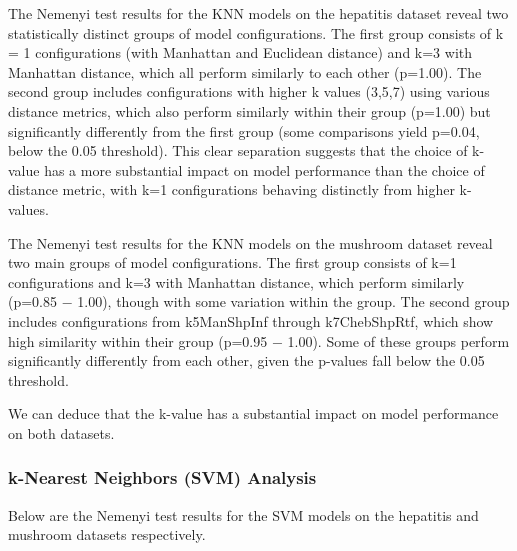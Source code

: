 The Nemenyi test results for the KNN models on the hepatitis dataset reveal two statistically distinct
groups of model configurations. The first group consists of k = 1 configurations
(with Manhattan and Euclidean distance) and k=3 with Manhattan distance, which all perform similarly to each other (p=1.00).
The second group includes configurations with higher k values (3,5,7) using various distance metrics,
which also perform similarly within their group (p=1.00) but significantly differently from the first
group (some comparisons yield p=0.04, below the 0.05 threshold). This clear separation suggests that the choice of k-value
has a more substantial impact on model performance than the choice of distance metric, with k=1 configurations behaving distinctly from higher k-values.

The Nemenyi test results for the KNN models on the mushroom dataset reveal two main groups of model configurations.
The first group consists of k=1 configurations and k=3 with Manhattan distance, which perform similarly
(p=0.85 $-$ 1.00), though with some variation within the group. The second group includes configurations
from k5ManShpInf through k7ChebShpRtf, which show high similarity within their group (p=0.95 $-$ 1.00).
Some of these groups perform significantly differently from each other, given the p-values fall below the 0.05 threshold.

We can deduce that the k-value has a substantial impact on model performance on both datasets. 

\subsubsection*{k-Nearest Neighbors (SVM) Analysis}
Below are the Nemenyi test results for the SVM models on the hepatitis and mushroom datasets respectively.

